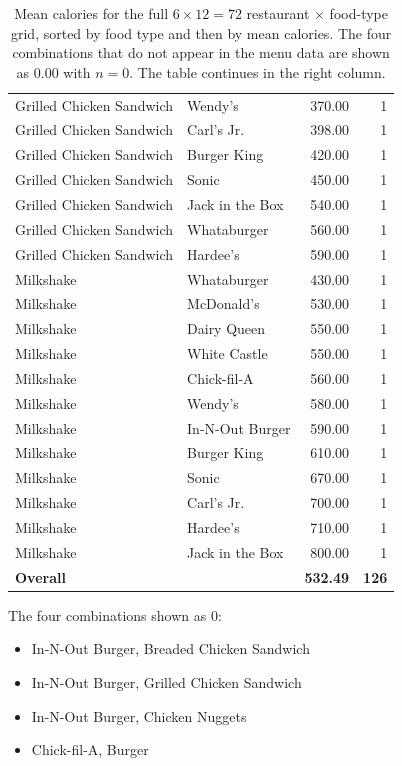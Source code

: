 \documentclass[11pt]{article}
\begin{document}
\begin{table}[H]
\begin{minipage}{0.49\textwidth}
\begin{tabular}{llrr}
Grilled Chicken Sandwich & Wendy's & 370.00 & 1 \\
Grilled Chicken Sandwich & Carl's Jr. & 398.00 & 1 \\
Grilled Chicken Sandwich & Burger King & 420.00 & 1 \\
Grilled Chicken Sandwich & Sonic & 450.00 & 1 \\
Grilled Chicken Sandwich & Jack in the Box & 540.00 & 1 \\
Grilled Chicken Sandwich & Whataburger & 560.00 & 1 \\
Grilled Chicken Sandwich & Hardee's & 590.00 & 1 \\
Milkshake & Whataburger & 430.00 & 1 \\
Milkshake & McDonald's & 530.00 & 1 \\
Milkshake & Dairy Queen & 550.00 & 1 \\
Milkshake & White Castle & 550.00 & 1 \\
Milkshake & Chick-fil-A & 560.00 & 1 \\
Milkshake & Wendy's & 580.00 & 1 \\
Milkshake & In-N-Out Burger & 590.00 & 1 \\
Milkshake & Burger King & 610.00 & 1 \\
Milkshake & Sonic & 670.00 & 1 \\
Milkshake & Carl's Jr. & 700.00 & 1 \\
Milkshake & Hardee's & 710.00 & 1 \\
Milkshake & Jack in the Box & 800.00 & 1 \\
\midrule
\textbf{Overall} & & \textbf{532.49} & \textbf{126} \\
\bottomrule
\end{tabular}
\end{minipage}
\caption{Mean calories for the full $6 \times 12 = 72$ restaurant $\times$ food-type grid,
sorted by food type and then by mean calories. The four combinations that do not appear in
the menu data are shown as $0.00$ with $n = 0$. The table continues in the right column.}
\end{table}

The four combinations shown as $0$:
\begin{itemize}\itemsep2pt
  \item In-N-Out Burger, Breaded Chicken Sandwich
  \item In-N-Out Burger, Grilled Chicken Sandwich
  \item In-N-Out Burger, Chicken Nuggets
  \item Chick-fil-A, Burger
\end{itemize}
\end{document}
